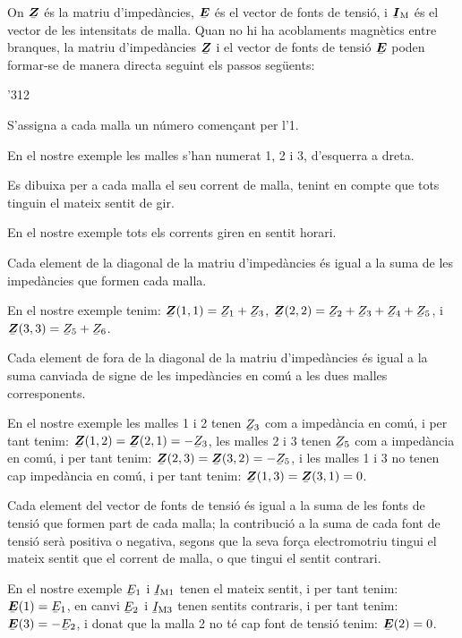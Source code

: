 On  $\mcmplx{Z}$ és la matriu d'impedàncies, $\mcmplx{E}$ és el vector de fonts de tensió, i $\mcmplx{I}\ped{M}$ és el vector de les intensitats de malla. Quan no hi ha acoblaments magnètics entre branques, la matriu d'impedàncies $\mcmplx{Z}$ i el vector de fonts de tensió $\mcmplx{E}$ poden formar-se de manera directa seguint els passos següents:
\begin{dingautolist}{'312}
   \item S'assigna a cada malla un número començant per l'1.

          En el nostre exemple les malles s'han numerat 1, 2 i 3, d'esquerra a dreta.
   \item Es dibuixa per a  cada malla el seu corrent de malla, tenint en compte que tots tinguin el mateix sentit de gir.

       En el nostre exemple tots els corrents giren en sentit horari.
   \item Cada element de la diagonal de la matriu d'impedàncies és igual a la suma de les impedàncies que formen cada malla.

       En el nostre exemple tenim: $\mcmplx{Z}(1,1)=\cmplx{Z}_1 + \cmplx{Z}_3$, $\mcmplx{Z}(2,2)=\cmplx{Z}_2 + \cmplx{Z}_3+ \cmplx{Z}_4+ \cmplx{Z}_5$, i $\mcmplx{Z}(3,3)=\cmplx{Z}_5 + \cmplx{Z}_6$.
   \item Cada element de fora de la diagonal de la matriu d'impedàncies és igual a la suma canviada de signe de les impedàncies en comú a les dues malles corresponents.

        En el nostre exemple les malles 1 i 2 tenen $\cmplx{Z}_3$ com a impedància en comú, i per tant tenim: $\mcmplx{Z}(1,2)=\mcmplx{Z}(2,1)= -\cmplx{Z}_3$, les malles 2 i 3 tenen $\cmplx{Z}_5$ com a impedància en comú, i per tant  tenim: $\mcmplx{Z}(2,3)=\mcmplx{Z}(3,2)= -\cmplx{Z}_5$, i les malles 1 i 3 no tenen cap impedància en comú, i per tant  tenim: $\mcmplx{Z}(1,3)=\mcmplx{Z}(3,1)= 0$.
    \item Cada element del vector de fonts de tensió és igual a la suma de les fonts de tensió que formen part de cada malla; la contribució a la suma de cada font de tensió serà positiva o negativa, segons que la seva força electromotriu tingui el mateix sentit que el corrent de malla, o que  tingui el sentit contrari.

         En el nostre exemple $\cmplx{E}_1$ i $\cmplx{I}\ped{M1}$ tenen el mateix sentit, i per tant tenim:   $\mcmplx{E}(1) = \cmplx{E}_1$, en canvi $\cmplx{E}_2$ i $\cmplx{I}\ped{M3}$ tenen   sentits contraris, i per tant   tenim:   $\mcmplx{E}(3) = -\cmplx{E}_2$, i donat que la malla 2 no té cap font de tensió  tenim:   $\mcmplx{E}(2) = 0$.
\end{dingautolist}



